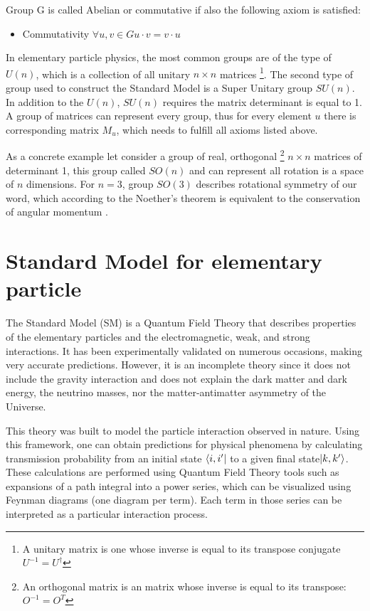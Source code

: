 Group G is called Abelian or commutative if also the following axiom is satisfied:
\begin{itemize}
    \item Commutativity $\forall u,v \in G u \cdot v = v \cdot u$
\end{itemize}

In elementary particle physics, the most common groups are of the type of $U(n)$, which is a collection of all unitary $n\times n$ matrices \footnote{A unitary matrix is one whose inverse is equal to its transpose conjugate $U^{-1}=U^\dagger$}. The second type of group used to construct the Standard Model is a Super Unitary group $SU(n)$. In addition to the $U(n)$, $SU(n)$ requires the matrix determinant is equal to 1. 
A group of matrices can represent every group, thus for every element $u$ there is corresponding matrix $M_u$, which needs to fulfill all axioms listed above. 

As a concrete example let consider a group of real, orthogonal \footnote{An orthogonal matrix is an matrix whose inverse is equal to its transpose: $O^{-1} = O^{T}$} $n\times n$ matrices of determinant 1, this group called $SO(n)$ and can represent all rotation is a space of $n$ dimensions. For $n=3$, group $SO(3)$  describes rotational symmetry of our word, which according to the Noether's theorem is equivalent to the conservation of angular momentum \cite{griffiths}. 

\section{Standard Model for elementary particle}
\label{sec:SM}

The Standard Model (SM) is a Quantum Field Theory that describes properties of the elementary particles and the electromagnetic, weak, and strong interactions. It has been experimentally validated on numerous occasions,
making very accurate predictions. However, it is an incomplete theory since it does not include the gravity interaction and does not explain the dark matter and dark energy, the neutrino masses, nor the matter-antimatter asymmetry of the Universe.

This theory was built to model the particle interaction observed in nature. Using this framework, one can obtain predictions for physical phenomena by calculating transmission probability from an initial state $\langle i, i'\rvert$ to a given final state$\lvert k, k' \rangle$. These calculations are performed using Quantum Field Theory tools such as expansions of a path integral into a power series, which can be visualized using Feynman diagrams (one diagram per term). Each term in those series can be interpreted as a particular interaction process. 

